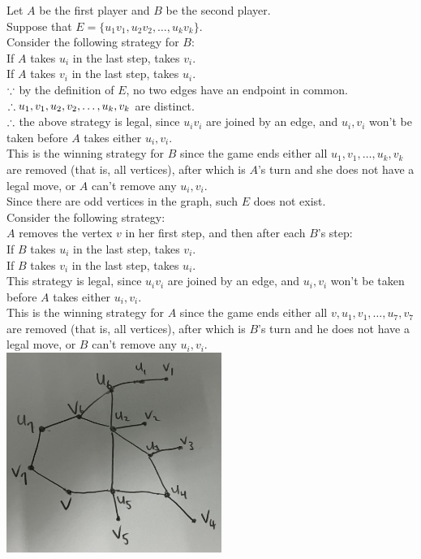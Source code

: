 \begin{pr}[2.12.15]
Let $A$ be the first player and $B$ be the second player.\\
Suppose that $E=\{u_1v_1, u_2v_2, \dots, u_kv_k\}$.\\
Consider the following strategy for $B$:\\
If $A$ takes $u_i$ in the last step, takes $v_i$.\\
If $A$ takes $v_i$ in the last step, takes $u_i$.\\
$\because$ by the definition of $E$, no two edges have an endpoint in common.\\
$\therefore u_1, v_1, u_2, v_2, \dots, u_k, v_k$ are distinct.\\
$\therefore$ the above strategy is legal, since $u_iv_i$ are joined by an edge, and $u_i, v_i$ won't be taken before $A$ takes either $u_i, v_i$.\\
This is the winning strategy for $B$ since the game ends either all $u_1, v_1, \dots, u_k, v_k$ are removed (that is, all vertices), after which is $A$'s turn and she does not have a legal move, or $A$ can't remove any $u_i, v_i$.\\
Since there are odd vertices in the graph, such $E$ does not exist.\\
Consider the following strategy:\\
$A$ removes the vertex $v$ in her first step, and then after each $B$'s step:\\
If $B$ takes $u_i$ in the last step, takes $v_i$.\\
If $B$ takes $v_i$ in the last step, takes $u_i$.\\
This strategy is legal, since $u_iv_i$ are joined by an edge, and $u_i, v_i$ won't be taken before $A$ takes either $u_i, v_i$.\\
This is the winning strategy for $A$ since the game ends either all $v, u_1, v_1, \dots, u_7, v_7$ are removed (that is, all vertices), after which is $B$'s turn and he does not have a legal move, or $B$ can't remove any $u_i, v_i$.\\
\includegraphics[width=7cm]{p3.JPG}
\end{pr}

\newpage
